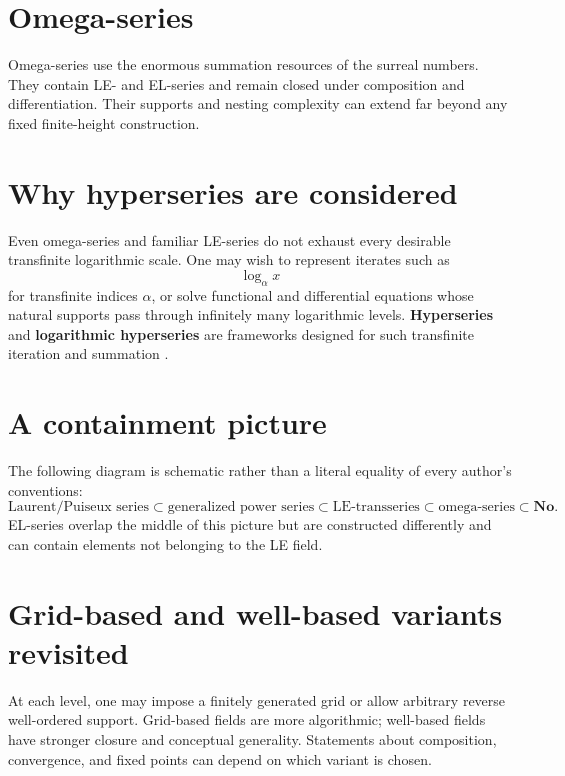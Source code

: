 \documentclass[11pt,openany]{book}
\theoremstyle{plain}
\theoremstyle{definition}
\theoremstyle{remark}
\newcommand{\defterm}[1]{\textbf{#1}}
\begin{document}
\section{Omega-series}
Omega-series use the enormous summation resources of the surreal numbers. They contain LE- and EL-series and remain closed under composition and differentiation. Their supports and nesting complexity can extend far beyond any fixed finite-height construction.

\section{Why hyperseries are considered}
Even omega-series and familiar LE-series do not exhaust every desirable transfinite logarithmic scale. One may wish to represent iterates such as
\[
  \log_\alpha x
\]
for transfinite indices $\alpha$, or solve functional and differential equations whose natural supports pass through infinitely many logarithmic levels. \defterm{Hyperseries} and \defterm{logarithmic hyperseries} are frameworks designed for such transfinite iteration and summation \cite{HoevenHyperseries}.

\section{A containment picture}
The following diagram is schematic rather than a literal equality of every author's conventions:
\[
  \text{Laurent/Puiseux series}
  \subset
  \text{generalized power series}
  \subset
  \text{LE-transseries}
  \subset
  \text{omega-series}
  \subset
  \mathbf{No}.
\]
EL-series overlap the middle of this picture but are constructed differently and can contain elements not belonging to the LE field.

\section{Grid-based and well-based variants revisited}
At each level, one may impose a finitely generated grid or allow arbitrary reverse well-ordered support. Grid-based fields are more algorithmic; well-based fields have stronger closure and conceptual generality. Statements about composition, convergence, and fixed points can depend on which variant is chosen.
\end{document}
